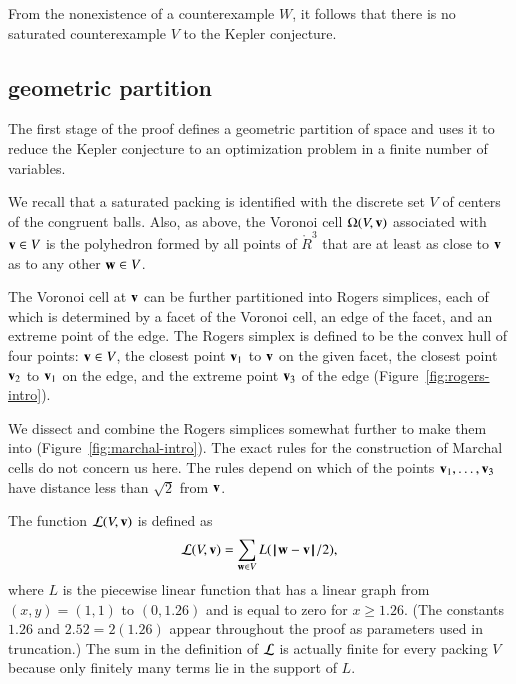 From the nonexistence of a counterexample $W$, 
it follows that there is no saturated
counterexample $V$ to the Kepler conjecture.



\subsection{geometric partition}

The first stage of the proof defines a geometric partition of space
and uses it to reduce the Kepler conjecture to an optimization problem
in a finite number of variables.

We recall that a saturated packing is
identified with the discrete set $V$ of centers of the
congruent balls.  Also, as above, the Voronoi cell $\Omega(V,{\mathbf v})$
associated with ${\mathbf v}\in V$ is the polyhedron formed by all points of
$\ring{R}^3$ that are at least as close to ${\mathbf v}$ as to any other ${\mathbf w}\in
V$.   

The Voronoi cell at ${\mathbf v}$ can be further partitioned into Rogers
simplices, each of which is determined by a facet of the Voronoi cell, an edge of
the facet, and an extreme point of the edge.  The Rogers simplex is defined to be the
convex hull of four points: ${\mathbf v}\in V$, the closest point ${\mathbf v}_1$ to ${\mathbf v}$ on the given facet, the closest point ${\mathbf v}_2$ to ${\mathbf v}_1$ on the edge, and the
extreme point ${\mathbf v}_3$ of the edge (Figure~\ref{fig:rogers-intro}).

\figORQISJR %

We dissect and combine the Rogers simplices somewhat further to make
them into  (Figure~\ref{fig:marchal-intro}).  
The exact rules for the
construction of Marchal cells do not concern us here.  The rules
depend on which of the points ${\mathbf v}_1,\ldots,{\mathbf v}_3$ have distance less
than $\sqrt2$ from ${\mathbf v}$.

\figODGBUWK %

The function
 ${\mathcal L}(V,{\mathbf v})$ is defined as
\begin{equation}\label{eqn:LV}
\CalL(V,\v) = \sum_{\w\in V} L(\norm{\w}{\v}/2),
\end{equation}
where $L$ is the piecewise linear function that has a linear graph from
$(x,y)=(1,1)$ to $(0,1.26)$ and is equal to zero for $x\ge 1.26$.  (The
constants $1.26$ and $2.52=2(1.26)$ appear throughout the proof as
parameters used in truncation.)   
The sum in the definition of ${\mathcal L}$ is actually finite for every packing $V$ because only finitely many terms
lie in the support of $L$. 


